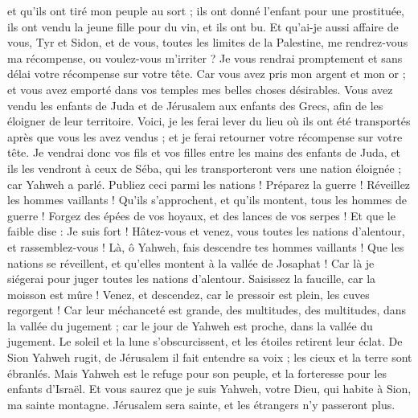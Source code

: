 \begin{multicols}{2}
et qu'ils ont tiré mon peuple au sort ; ils ont donné l'enfant pour une prostituée, ils ont vendu la jeune fille pour du vin, et ils ont bu.
Et qu'ai-je aussi affaire de vous, Tyr et Sidon, et de vous, toutes les limites de la Palestine, me rendrez-vous ma récompense, ou voulez-vous m'irriter ? Je vous rendrai promptement et sans délai votre récompense sur votre tête.
Car vous avez pris mon argent et mon or ; et vous avez emporté dans vos temples mes belles choses désirables.
Vous avez vendu les enfants de Juda et de Jérusalem aux enfants des Grecs, afin de les éloigner de leur territoire.
Voici, je les ferai lever du lieu où ils ont été transportés après que vous les avez vendus ; et je ferai retourner votre récompense sur votre tête.
Je vendrai donc vos fils et vos filles entre les mains des enfants de Juda, et ils les vendront à ceux de Séba, qui les transporteront vers une nation éloignée ; car Yahweh a parlé.
Publiez ceci parmi les nations ! Préparez la guerre ! Réveillez les hommes vaillants ! Qu'ils s'approchent, et qu'ils montent, tous les hommes de guerre !
Forgez des épées de vos hoyaux, et des lances de vos serpes ! Et que le faible dise : Je suis fort !
Hâtez-vous et venez, vous toutes les nations d'alentour, et rassemblez-vous ! Là, ô Yahweh, fais descendre tes hommes vaillants !
Que les nations se réveillent, et qu'elles montent à la vallée de Josaphat ! Car là je siégerai pour juger toutes les nations d'alentour.
Saisissez la faucille, car la moisson est mûre ! Venez, et descendez, car le pressoir est plein, les cuves regorgent ! Car leur méchanceté est grande,
des multitudes, des multitudes, dans la vallée du jugement ; car le jour de Yahweh est proche, dans la vallée du jugement.
Le soleil et la lune s'obscurcissent, et les étoiles retirent leur éclat.
De Sion Yahweh rugit, de Jérusalem il fait entendre sa voix ; les cieux et la terre sont ébranlés. Mais Yahweh est le refuge pour son peuple, et la forteresse pour les enfants d'Israël.
Et vous saurez que je suis Yahweh, votre Dieu, qui habite à Sion, ma sainte montagne. Jérusalem sera sainte, et les étrangers n'y passeront plus.

\end{multicols}
